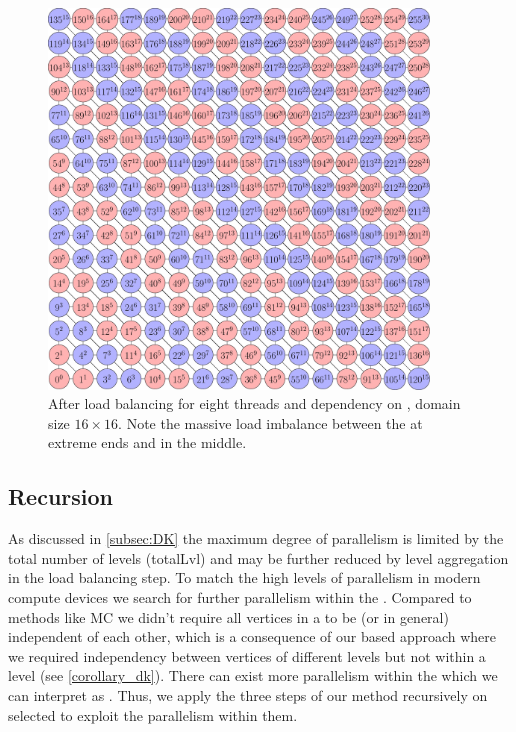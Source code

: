       \begin{figure}
      	\begin{minipage}[c]{0.63\textwidth}
      		\includegraphics[height=0.26\textheight,width=0.9\textwidth]{pics/load_balancing/2d-7pt/stencil_2d_7pt_8_threads}
      	\end{minipage}\hfill
      	\begin{minipage}[c]{0.34\textwidth}
      		\caption{After load balancing for eight threads and \DTWO dependency on \stex, domain size $16 \times 16$. Note the massive load imbalance between the \levelGroups at extreme ends and in 
      			the middle. }
      		 \label{fig:2d_7pt_lb_8_threads}
      	\end{minipage}
      \end{figure}  

	\subsection{Recursion}\label{subsec:REC}
As discussed in \cref{subsec:DK} the maximum degree of parallelism is limited by the total number of levels (\acrshort{totalLvl}) and may be further reduced by level aggregation in the load balancing step.  To match the high levels of parallelism in modern compute devices we search for further parallelism within the \levelGroups.  Compared to methods like \acrshort{MC} we didn't require all vertices in a \levelGroup to be \DONE (or \DK in general) independent of each other, which is a consequence of our \level based approach where we required \DK independency between vertices of different levels but not within a level (see \cref{corollary_dk}). There can exist more parallelism within the \levelGroups which we can interpret as \subgraphs.  Thus, we apply the three steps of our method recursively on selected \subgraphs to exploit the parallelism within them.  


